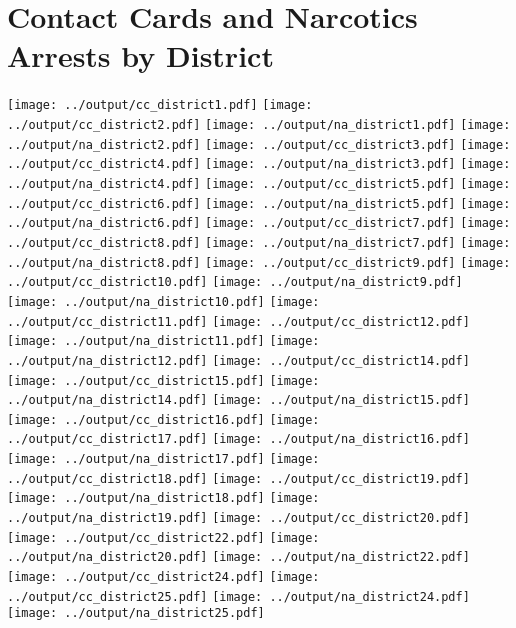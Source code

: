 \documentclass[]{article}
\begin{document}
\section*{Contact Cards and Narcotics Arrests by District}
\texttt{[image: ../output/cc\_district1.pdf]}
\texttt{[image: ../output/cc\_district2.pdf]}
\texttt{[image: ../output/na\_district1.pdf]}
\texttt{[image: ../output/na\_district2.pdf]}
\texttt{[image: ../output/cc\_district3.pdf]}
\texttt{[image: ../output/cc\_district4.pdf]}
\texttt{[image: ../output/na\_district3.pdf]}
\texttt{[image: ../output/na\_district4.pdf]}
\texttt{[image: ../output/cc\_district5.pdf]}
\texttt{[image: ../output/cc\_district6.pdf]}
\texttt{[image: ../output/na\_district5.pdf]}
\texttt{[image: ../output/na\_district6.pdf]}
\texttt{[image: ../output/cc\_district7.pdf]}
\texttt{[image: ../output/cc\_district8.pdf]}
\texttt{[image: ../output/na\_district7.pdf]}
\texttt{[image: ../output/na\_district8.pdf]}
\texttt{[image: ../output/cc\_district9.pdf]}
\texttt{[image: ../output/cc\_district10.pdf]}
\texttt{[image: ../output/na\_district9.pdf]}
\texttt{[image: ../output/na\_district10.pdf]}
\texttt{[image: ../output/cc\_district11.pdf]}
\texttt{[image: ../output/cc\_district12.pdf]}
\texttt{[image: ../output/na\_district11.pdf]}
\texttt{[image: ../output/na\_district12.pdf]}
\texttt{[image: ../output/cc\_district14.pdf]}
\texttt{[image: ../output/cc\_district15.pdf]}
\texttt{[image: ../output/na\_district14.pdf]}
\texttt{[image: ../output/na\_district15.pdf]}
\texttt{[image: ../output/cc\_district16.pdf]}
\texttt{[image: ../output/cc\_district17.pdf]}
\texttt{[image: ../output/na\_district16.pdf]}
\texttt{[image: ../output/na\_district17.pdf]}
\texttt{[image: ../output/cc\_district18.pdf]}
\texttt{[image: ../output/cc\_district19.pdf]}
\texttt{[image: ../output/na\_district18.pdf]}
\texttt{[image: ../output/na\_district19.pdf]}
\texttt{[image: ../output/cc\_district20.pdf]}
\texttt{[image: ../output/cc\_district22.pdf]}
\texttt{[image: ../output/na\_district20.pdf]}
\texttt{[image: ../output/na\_district22.pdf]}
\texttt{[image: ../output/cc\_district24.pdf]}
\texttt{[image: ../output/cc\_district25.pdf]}
\texttt{[image: ../output/na\_district24.pdf]}
\texttt{[image: ../output/na\_district25.pdf]}
\end{document}
